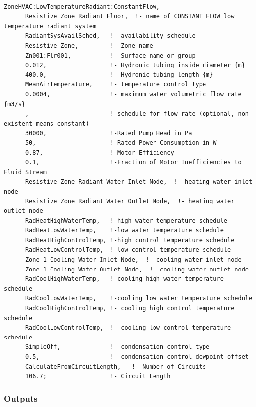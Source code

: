 \begin{lstlisting}

ZoneHVAC:LowTemperatureRadiant:ConstantFlow,
      Resistive Zone Radiant Floor,  !- name of CONSTANT FLOW low temperature radiant system
      RadiantSysAvailSched,   !- availability schedule
      Resistive Zone,         !- Zone name
      Zn001:Flr001,           !- Surface name or group
      0.012,                  !- Hydronic tubing inside diameter {m}
      400.0,                  !- Hydronic tubing length {m}
      MeanAirTemperature,     !- temperature control type
      0.0004,                 !- maximum water volumetric flow rate {m3/s}
      ,                       !-schedule for flow rate (optional, non-existent means constant)
      30000,                  !-Rated Pump Head in Pa
      50,                     !-Rated Power Consumption in W
      0.87,                   !-Motor Efficiency
      0.1,                    !-Fraction of Motor Inefficiencies to Fluid Stream
      Resistive Zone Radiant Water Inlet Node,  !- heating water inlet node
      Resistive Zone Radiant Water Outlet Node,  !- heating water outlet node
      RadHeatHighWaterTemp,   !-high water temperature schedule
      RadHeatLowWaterTemp,    !-low water temperature schedule
      RadHeatHighControlTemp, !-high control temperature schedule
      RadHeatLowControlTemp,  !-low control temperature schedule
      Zone 1 Cooling Water Inlet Node,  !- cooling water inlet node
      Zone 1 Cooling Water Outlet Node,  !- cooling water outlet node
      RadCoolHighWaterTemp,   !-cooling high water temperature schedule
      RadCoolLowWaterTemp,    !-cooling low water temperature schedule
      RadCoolHighControlTemp, !- cooling high control temperature schedule
      RadCoolLowControlTemp,  !- cooling low control temperature schedule
      SimpleOff,              !- condensation control type
      0.5,                    !- condensation control dewpoint offset
      CalculateFromCircuitLength,   !- Number of Circuits
      106.7;                  !- Circuit Length
\end{lstlisting}

\subsubsection{Outputs}\label{outputs-6-007}

